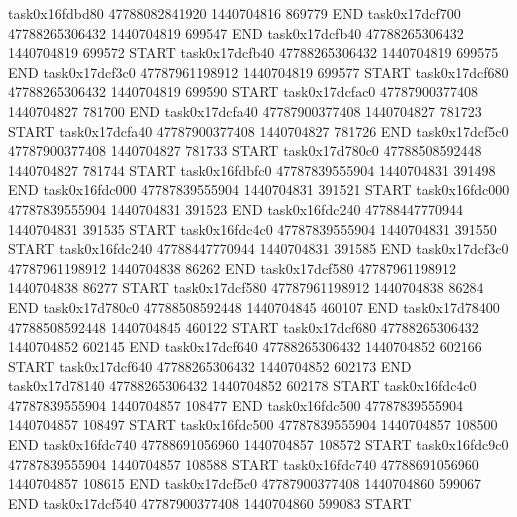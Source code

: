 task0x16fdbd80 47788082841920          1440704816               869779  END
task0x17dcf700 47788265306432          1440704819               699547  END
task0x17dcfb40 47788265306432          1440704819               699572  START
task0x17dcfb40 47788265306432          1440704819               699575  END
task0x17dcf3c0 47787961198912          1440704819               699577  START
task0x17dcf680 47788265306432          1440704819               699590  START
task0x17dcfac0 47787900377408          1440704827               781700  END
task0x17dcfa40 47787900377408          1440704827               781723  START
task0x17dcfa40 47787900377408          1440704827               781726  END
task0x17dcf5c0 47787900377408          1440704827               781733  START
task0x17d780c0 47788508592448          1440704827               781744  START
task0x16fdbfc0 47787839555904          1440704831               391498  END
task0x16fdc000 47787839555904          1440704831               391521  START
task0x16fdc000 47787839555904          1440704831               391523  END
task0x16fdc240 47788447770944          1440704831               391535  START
task0x16fdc4c0 47787839555904          1440704831               391550  START
task0x16fdc240 47788447770944          1440704831               391585  END
task0x17dcf3c0 47787961198912          1440704838                86262  END
task0x17dcf580 47787961198912          1440704838                86277  START
task0x17dcf580 47787961198912          1440704838                86284  END
task0x17d780c0 47788508592448          1440704845               460107  END
task0x17d78400 47788508592448          1440704845               460122  START
task0x17dcf680 47788265306432          1440704852               602145  END
task0x17dcf640 47788265306432          1440704852               602166  START
task0x17dcf640 47788265306432          1440704852               602173  END
task0x17d78140 47788265306432          1440704852               602178  START
task0x16fdc4c0 47787839555904          1440704857               108477  END
task0x16fdc500 47787839555904          1440704857               108497  START
task0x16fdc500 47787839555904          1440704857               108500  END
task0x16fdc740 47788691056960          1440704857               108572  START
task0x16fdc9c0 47787839555904          1440704857               108588  START
task0x16fdc740 47788691056960          1440704857               108615  END
task0x17dcf5c0 47787900377408          1440704860               599067  END
task0x17dcf540 47787900377408          1440704860               599083  START
